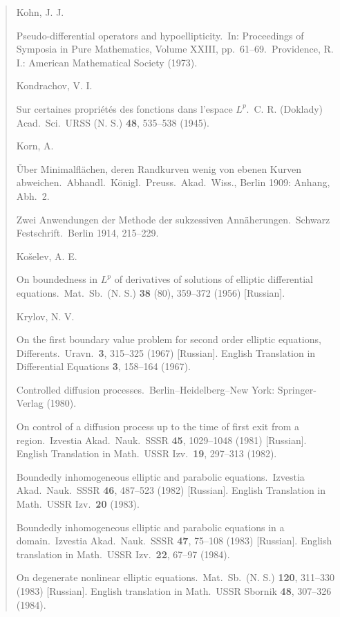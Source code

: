 \begin{quote}
\noindent Kohn, J. J.

\noindent [KJ]\quad Pseudo-differential operators and hypoellipticity.\ In: Proceedings of Symposia in Pure Mathematics, Volume XXIII, pp.\ 61--69.\ Providence, R. I.: American Mathematical Society (1973).

\noindent Kondrachov, V. I.

\noindent [KN]\quad Sur certaines propri\'et\'es des fonctions dans l'espace $L^p$.\ C. R. (Doklady) Acad.\ Sci.\ URSS (N. S.) \textbf{48}, 535--538 (1945).

\noindent Korn, A.

\noindent [KR 1]\quad \v{U}ber Minimalfl\"achen, deren Randkurven wenig von ebenen Kurven abweichen.\ Abhandl.\ K\"onigl.\ Preuss.\ Akad.\ Wiss., Berlin 1909: Anhang, Abh.\ 2.

\noindent [KR 2]\quad Zwei Anwendungen der Methode der sukzessiven Ann\"aherungen.\ Schwarz Festschrift.\ Berlin 1914, 215--229.

\noindent Ko\v{s}elev, A. E.

\noindent [KO]\quad On boundedness in $L^p$ of derivatives of solutions of elliptic differential equations.\ Mat.\ Sb.\ (N. S.) \textbf{38} (80), 359--372 (1956) [Russian].

\noindent Krylov, N. V.

\noindent [KV 1]\quad On the first boundary value problem for second order elliptic equations, Differents.\ Uravn.\ \textbf{3}, 315--325 (1967) [Russian]. English Translation in Differential Equations \textbf{3}, 158--164 (1967).

\noindent [KV 2]\quad Controlled diffusion processes.\ Berlin--Heidelberg--New York: Springer-Verlag (1980).

\noindent [KV 3]\quad On control of a diffusion process up to the time of first exit from a region.\ Izvestia Akad.\ Nauk.\ SSSR \textbf{45}, 1029--1048 (1981) [Russian]. English Translation in Math.\ USSR Izv.\ \textbf{19}, 297--313 (1982).

\noindent [KV 4]\quad Boundedly inhomogeneous elliptic and parabolic equations.\ Izvestia Akad.\ Nauk.\ SSSR \textbf{46}, 487--523 (1982) [Russian]. English Translation in Math.\ USSR Izv.\ \textbf{20} (1983).

\noindent [KV 5]\quad Boundedly inhomogeneous elliptic and parabolic equations in a domain.\ Izvestia Akad.\ Nauk.\ SSSR \textbf{47}, 75--108 (1983) [Russian]. English translation in Math.\ USSR Izv.\ \textbf{22}, 67--97 (1984).

\noindent [KV 6]\quad On degenerate nonlinear elliptic equations.\ Mat.\ Sb.\ (N. S.) \textbf{120}, 311--330 (1983) [Russian]. English translation in Math.\ USSR Sbornik \textbf{48}, 307--326 (1984).
\end{quote}

